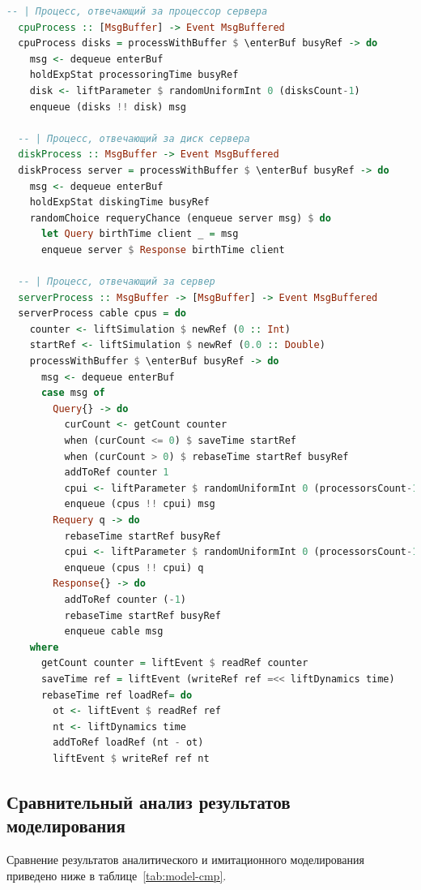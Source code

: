 \documentclass[russian,utf8,emptystyle]{eskdtext}
\begin{document}
\begin{lstlisting}[language=Haskell]
  -- | Процесс, отвечающий за процессор сервера
  cpuProcess :: [MsgBuffer] -> Event MsgBuffered
  cpuProcess disks = processWithBuffer $ \enterBuf busyRef -> do
    msg <- dequeue enterBuf
    holdExpStat processoringTime busyRef
    disk <- liftParameter $ randomUniformInt 0 (disksCount-1) 
    enqueue (disks !! disk) msg
  
  -- | Процесс, отвечающий за диск сервера
  diskProcess :: MsgBuffer -> Event MsgBuffered
  diskProcess server = processWithBuffer $ \enterBuf busyRef -> do
    msg <- dequeue enterBuf
    holdExpStat diskingTime busyRef
    randomChoice requeryChance (enqueue server msg) $ do
      let Query birthTime client _ = msg
      enqueue server $ Response birthTime client
      
  -- | Процесс, отвечающий за сервер    
  serverProcess :: MsgBuffer -> [MsgBuffer] -> Event MsgBuffered
  serverProcess cable cpus = do
    counter <- liftSimulation $ newRef (0 :: Int)
    startRef <- liftSimulation $ newRef (0.0 :: Double)
    processWithBuffer $ \enterBuf busyRef -> do
      msg <- dequeue enterBuf
      case msg of
        Query{} -> do
          curCount <- getCount counter
          when (curCount <= 0) $ saveTime startRef
          when (curCount > 0) $ rebaseTime startRef busyRef
          addToRef counter 1
          cpui <- liftParameter $ randomUniformInt 0 (processorsCount-1)
          enqueue (cpus !! cpui) msg
        Requery q -> do
          rebaseTime startRef busyRef
          cpui <- liftParameter $ randomUniformInt 0 (processorsCount-1)
          enqueue (cpus !! cpui) q
        Response{} -> do
          addToRef counter (-1)
          rebaseTime startRef busyRef
          enqueue cable msg
    where
      getCount counter = liftEvent $ readRef counter
      saveTime ref = liftEvent (writeRef ref =<< liftDynamics time)
      rebaseTime ref loadRef= do 
        ot <- liftEvent $ readRef ref
        nt <- liftDynamics time
        addToRef loadRef (nt - ot)
        liftEvent $ writeRef ref nt
\end{lstlisting}

\clearpage
\subsection{Сравнительный анализ результатов моделирования}

Сравнение результатов аналитического и имитационного моделирования приведено ниже в таблице~\ref{tab:model-cmp}.
\end{document}
